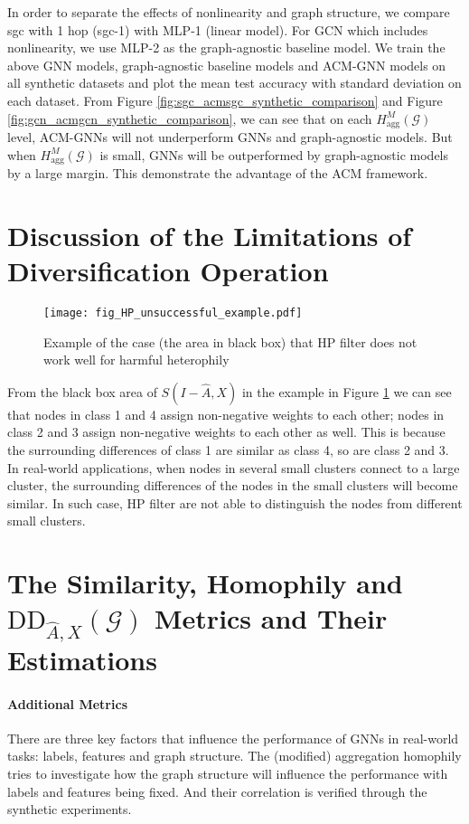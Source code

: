 \documentclass{article}
\newcommand{\0}{{\boldsymbol{0}}}
\newcommand{\6}{{\partial}}
\newcommand{\8}{{\infty}}
\newcommand{\4}{{\nabla}}
\begin{document}
In order to separate the effects of nonlinearity and graph structure, we compare sgc with 1 hop (sgc-1) with MLP-1 (linear model). For GCN which includes nonlinearity, we use MLP-2 as the graph-agnostic baseline model. We train the above GNN models, graph-agnostic baseline models and ACM-GNN models on all synthetic datasets and plot the mean test accuracy with standard deviation on each dataset. From Figure \ref{fig:sgc_acmsgc_synthetic_comparison} and Figure \ref{fig:gcn_acmgcn_synthetic_comparison}, we can see that on each $H_\text{agg}^M(\mathcal{G})$ level, ACM-GNNs will not underperform GNNs and graph-agnostic models. But when $H_\text{agg}^M(\mathcal{G})$ is small, GNNs will be outperformed by graph-agnostic models by a large margin. This demonstrate the advantage of the ACM framework.

\section{Discussion of the Limitations of Diversification Operation}
\label{appendix:limitation_diversification}
\begin{figure}[htbp]
\centering
{
\captionsetup{justification = centering}
\texttt{[image: fig\_HP\_unsuccessful\_example.pdf]}}
{\caption{Example of the case (the area in black box) that HP filter does not work well for harmful heterophily}\label{fig:unsuccessful_example_hp_filter}
}
\end{figure}
From the black box area of $S(I-\hat{A},X)$ in the example in Figure \ref{fig:unsuccessful_example_hp_filter} we can see that nodes in class 1 and 4 assign non-negative weights to each other; nodes in class 2 and 3 assign non-negative weights to each other as well. This is because the surrounding differences of class 1 are similar as class 4, so are class 2 and 3. In real-world applications, when nodes in several small clusters connect to a large cluster, the surrounding differences of the nodes in the small clusters will become similar. In such case, HP filter are not able to distinguish the nodes from different small clusters. 

\section{The Similarity, Homophily and $\mathrm{DD}_{\hat{A},X}(\mathcal{G})$ Metrics and Their Estimations}
\label{appendix:estimation_similarity_homophily_diversification_metrics}
\paragraph{Additional Metrics}
There are three key factors that influence the performance of GNNs in real-world tasks: labels, features and graph structure. The (modified) aggregation homophily tries to investigate how the graph structure will influence the performance with labels and features being fixed. And their correlation is verified through the synthetic experiments. 
\end{document}

